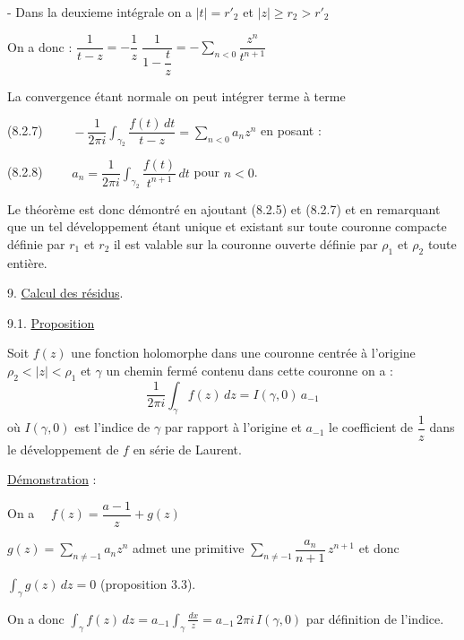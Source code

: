
- Dans la deuxieme intégrale on a $|t| = r'_2$ et $|z| \geq r_2 > r'_2$

On a donc : $\dfrac{1}{t-z} = -\dfrac{1}{z}\;\dfrac{1}{1-\dfrac{t}{z}} = -\sum\limits_{n<0} \dfrac{z^n}{t^{n+1}}$

La convergence étant normale on peut intégrer terme à terme

(8.2.7) $\qquad -\dfrac{1}{2\pi i}\displaystyle\int_{\gamma_2} \dfrac{f(t)\,dt}{t-z} = \sum\limits_{n<0} a_n z^n$ en posant :

(8.2.8) $\qquad a_n = \dfrac{1}{2\pi i}\displaystyle\int_{\gamma_2} \dfrac{f(t)}{t^{n+1}}\,dt$ pour $n<0$.

Le théorème est donc démontré en ajoutant (8.2.5) et (8.2.7) et en
remarquant que un tel développement étant unique et existant sur toute couronne
compacte définie par $r_1$ et $r_2$ il est valable sur la couronne ouverte définie
par $\rho_1$ et $\rho_2$ toute entière.

9. \uline{Calcul des résidus}.

9.1. \uline{Proposition}

Soit $f(z)$ une fonction holomorphe dans une couronne centrée à
l'origine $\rho_2 < |z| < \rho_1$ et $\gamma$ un chemin fermé contenu dans cette couronne
on a :
\[ \frac{1}{2\pi i}\int_\gamma f(z)\,dz = I(\gamma,0)\,a_{-1} \]
où $I(\gamma,0)$ est l'indice de $\gamma$ par rapport à l'origine et $a_{-1}$ le coefficient
de $\dfrac{1}{z}$ dans le développement de $f$ en série de Laurent.

\uline{Démonstration} :

On a $\quad f(z) = \dfrac{a-1}{z} + g(z)$

$g(z) = \sum\limits_{n\neq -1} a_n z^n$ admet une primitive $\sum\limits_{n\neq -1} \dfrac{a_n}{n+1}\, z^{n+1}$ et donc

$\displaystyle\int_\gamma g(z)\,dz = 0$ \quad (proposition 3.3).

On a donc $\displaystyle\int_\gamma f(z)\,dz = a_{-1}\int_\gamma \frac{dx}{z} = a_{-1}\, 2\pi i\, I(\gamma,0)$ par définition de
l'indice.

